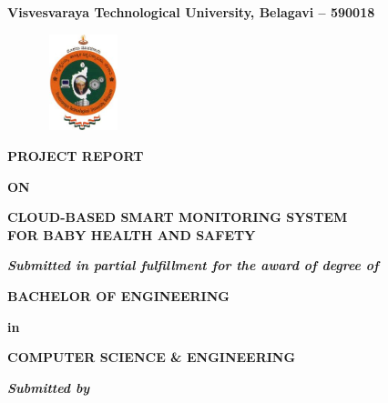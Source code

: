 \documentclass[12pt,a4paper]{report}
\begin{document}
\pagestyle{empty}
\begin{center}

    {\large \textbf{Visvesvaraya Technological University, Belagavi – 590018}}
    \begin{figure}[hbtp]
        \centering
        \includegraphics[width=2.3cm,height=2.8cm]{./pic/vtu}
    \end{figure}

    \textbf{PROJECT REPORT}
    \par
    \textbf{ON}
    \par
    \vspace{8pt}
    {\Large\textbf{CLOUD-BASED SMART MONITORING SYSTEM \\[0.3em] FOR BABY HEALTH AND SAFETY}}
    \par
    \vspace{10pt}
    \par
    \textit{\textbf{Submitted in partial fulfillment for the award of degree of }}
    \par
    \vspace{12pt}
    \large \textbf{BACHELOR OF ENGINEERING }
    \par
    \textbf{in}
    \par
    \large \textbf{COMPUTER SCIENCE \& ENGINEERING}
    \par
    \vspace{12pt}
    \textit{\textbf{Submitted by}}
    \vspace{8pt}



\end{center}
\end{document}
